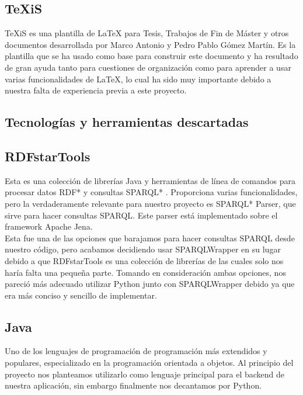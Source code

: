 \subsection*{TeXiS}

TeXiS es una plantilla de LaTeX para Tesis, Trabajos de Fin de Máster y otros documentos desarrollada por Marco Antonio y Pedro Pablo Gómez Martín. Es la plantilla que se ha usado como base para construir este documento y ha resultado de gran ayuda tanto para cuestiones de organización como para aprender a usar varias funcionalidades de LaTeX, lo cual ha sido muy importante debido a nuestra falta de experiencia previa a este proyecto.

\subsection{Tecnologías y herramientas descartadas}

\subsection*{RDFstarTools}

Esta es una colección de librerías Java y herramientas de línea de comandos para procesar datos RDF* y consultas SPARQL* \cite{rdfstartools}. Proporciona varias funcionalidades, pero la verdaderamente relevante para nuestro proyecto es SPARQL* Parser, que sirve para hacer consultas SPARQL. Este parser está implementado sobre el framework Apache Jena.\\


Esta fue una de las opciones que barajamos para hacer consultas SPARQL desde nuestro código, pero acabamos decidiendo usar SPARQLWrapper en su lugar debido a que RDFstarTools es una colección de librerías de las cuales solo nos haría falta una pequeña parte. Tomando en consideración ambas opciones, nos pareció más adecuado utilizar Python junto con SPARQLWrapper debido ya que era más conciso y sencillo de implementar.

\subsection*{Java}

Uno de los lenguajes de programación de programación más extendidos y populares, especializado en la programación orientada a objetos. Al principio del proyecto nos planteamos utilizarlo como lenguaje principal para el backend de nuestra aplicación, sin embargo finalmente nos decantamos por Python.\\

